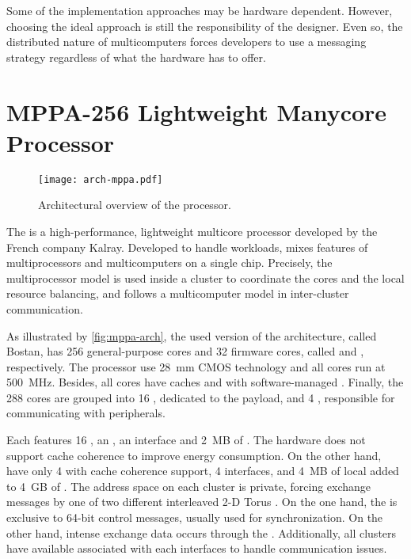 				Some of the implementation approaches may be hardware dependent.
				However, choosing the ideal approach is still the responsibility of the \os designer.
				Even so, the distributed nature of multicomputers forces developers to
				use a messaging strategy regardless of what the hardware has to offer.

\section{MPPA-256 Lightweight Manycore Processor}
\label{sec.mppa}

	\begin{figure}[!tb]
		\centering%
		\caption{Architectural overview of the \mppa processor.}%
		\label{fig:mppa-arch}%
		\texttt{[image: arch-mppa.pdf]}%
	\end{figure}

	The \mppa is a high-performance, lightweight multicore processor
	developed by the French company Kalray.
	Developed to handle \mimd workloads, \mppa mixes features of
	multiprocessors and multicomputers on a single chip.
	Precisely, the multiprocessor model is used inside a cluster
	to coordinate the cores and the local resource balancing, and
	follows a multicomputer model in inter-cluster communication.

	As illustrated by \autoref{fig:mppa-arch},
	the used version of
	the architecture, called Bostan, has 256 general-purpose cores and
	32 firmware cores, called \pes and \rms, respectively.
	The processor use 28~mm CMOS technology and all cores run at 500~MHz.
	Besides, all cores have caches and \mmus with software-managed \tlbs.
	Finally, the 288 cores are grouped into 16 \cclusters, dedicated to
	the payload, and 4 \ioclusters, responsible for communicating with peripherals.

	Each \ccluster features 16 \pes, an \rm, an \noc interface and 2~MB of \sram.
	The hardware does not support cache coherence to improve energy consumption.
	On the other hand, \ioclusters have only 4 \rms with cache coherence support,
	4 \noc interfaces, and 4~MB of local \sram added to 4~GB of \dram.
	The address space on each cluster is private, forcing exchange messages
	by one of two different interleaved 2-D Torus \nocs.
	On the one hand, the \cnoc is exclusive to 64-bit control messages,
	usually used for synchronization.
	On the other hand, intense exchange data occurs through the \dnoc.
	Additionally, all clusters have available \dmas associated with each
	\noc interfaces to handle communication issues.

